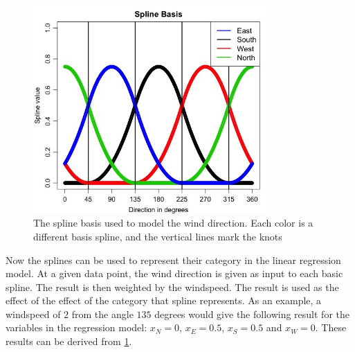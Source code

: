 \begin{figure}
    \centering
    \includegraphics[width=0.8\textwidth]{../../../figures/SplineBasis.jpeg}
    \caption{The spline basis used to model the wind direction. Each color is a different basis spline, and the vertical lines mark the knots}
    \label{fig:spline_basis}
\end{figure}

Now the splines can be used to represent their category in the linear regression model. At a given data point, the wind direction is given as input to each basic spline. The result is then weighted by the windspeed. The result is used as the effect of the effect of the category that spline represents. As an example, a windspeed of $2$ from the angle $135$ degrees would give the following result for the variables in the regression model: $x_N=0$, $x_E=0.5$, $x_S=0.5$ and $x_W=0$. These results can be derived from \cref{fig:spline_basis}.







